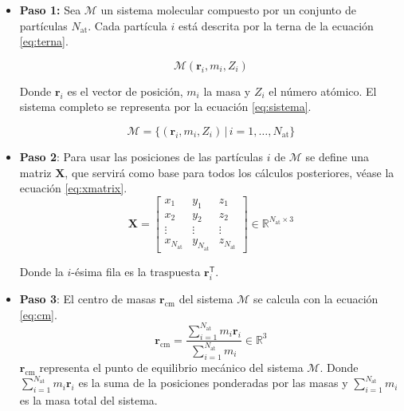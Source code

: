 	\begin{itemize}
		\item \textbf{Paso 1:}
		Sea $\mathcal{M}$ un sistema molecular compuesto por un conjunto de part\'{i}culas $N_{\text{at}}$. Cada part\'{i}cula $i$ est\'{a} descrita por la terna de la ecuaci\'{o}n \ref{eq:terna}.
		
		\begin{equation}
			\mathcal{M} (\mathbf{r}_i, m_i, Z_i)
			\label{eq:terna}
		\end{equation}
		
		Donde $\mathbf{r}_i$ es el vector de posici\'{o}n, $m_i$ la masa y $Z_i$ el n\'{u}mero at\'{o}mico. El sistema completo se representa por la ecuaci\'{o}n \ref{eq:sistema}.	
		
		\begin{equation}
			\mathcal{M} = \bigl\{(\mathbf{r}_i, m_i, Z_i) \,\big|\, i = 1,\dots,N_{\text{at}}\bigr\}
			\label{eq:sistema}
		\end{equation}
	
		\item \textbf{Paso 2}: Para usar las posiciones de las part\'{i}culas $i$ de $\mathcal{M}$ se define una matriz $\mathbf{X}$, que servir\'{a} como base para todos los c\'{a}lculos posteriores, v\'{e}ase la ecuaci\'{o}n \ref{eq:xmatrix}.
		\begin{equation}
			\mathbf{X} = \begin{bmatrix}
				x_1 & y_1 & z_1 \\
				x_2 & y_2 & z_2 \\
				\vdots & \vdots & \vdots \\
				x_{N_{\text{at}}} & y_{N_{\text{at}}} & z_{N_{\text{at}}}
			\end{bmatrix} \in \mathbb{R}^{N_{\text{at}} \times 3}
			\label{eq:xmatrix}
		\end{equation}
		
		Donde la $i$-\'{e}sima fila es la traspuesta $\mathbf{r}_i^{\mathsf T}$.
		
		
		\item \textbf{Paso 3}: El centro de masas $\mathbf{r}_{\text{cm}}$ del sistema $\mathcal{M}$ se calcula con la ecuaci\'{o}n \ref{eq:cm}.
		\begin{equation}
			\mathbf{r}_{\text{cm}}
			= \frac{\displaystyle \sum_{i=1}^{N_{\text{at}}} m_i \mathbf{r}_i}
			{\displaystyle \sum_{i=1}^{N_{\text{at}}} m_i}
			\in \mathbb{R}^3
			\label{eq:cm}
		\end{equation}
		$\mathbf{r}_{\text{cm}}$ representa el punto de equilibrio mec\'{a}nico del sistema $\mathcal{M}$. 
		Donde $\displaystyle \sum_{i=1}^{N_{\text{at}}} m_i \mathbf{r}_i$ es la suma de la posiciones ponderadas por las masas y $\displaystyle \sum_{i=1}^{N_{\text{at}}} m_i$ es la masa total del sistema.
		

\end{itemize}
